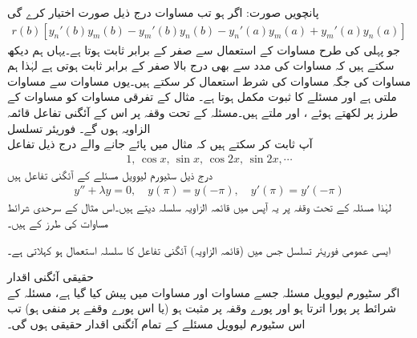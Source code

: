 پانچویں صورت: اگر  ہو تب مساوات   درج ذیل صورت اختیار کرے گی
\begin{align*}
r(b)[y_n'(b)y_m(b)-y_m'(b)y_n(b)-y_n'(a)y_m(a)+y_m'(a)y_n(a)]
\end{align*}
جو پہلی کی طرح  مساوات  کے استعمال سے صفر کے برابر ثابت ہوتا ہے۔یہاں ہم دیکھ سکتے ہیں کہ مساوات  کی مدد سے بھی درج بالا صفر کے برابر ثابت ہوتی ہے لہٰذا ہم مساوات  کی جگہ مساوات  کی شرط استعمال کر سکتے ہیں۔یوں مساوات  سے مساوات  ملتی ہے اور مسئلے کا ثبوت مکمل ہوتا ہے۔
مثال  کے تفرقی مساوات کو مساوات  کے طرز پر لکھتے ہوئے ،  اور  ملتے ہیں۔مسئلہ  کے تحت وقفہ  پر اس کے آئگنی تفاعل قائمہ الزاویہ ہوں گے۔
\quad فوریئر تسلسل\\
آپ ثابت کر سکتے ہیں کہ مثال  میں پائے جانے والے درج ذیل تفاعل 
\begin{align*}
1,\, \cos x , \, \sin x,\, \cos 2x,\, \sin 2x, \cdots
\end{align*}
درج ذیل سٹیورم لیوویل مسئلے کے آئگنی تفاعل ہیں
\begin{align*}
y''+\lambda y=0, \quad y(\pi)=y(-\pi), \quad y'(\pi)=y'(-\pi)
\end{align*}
 لہٰذا مسئلہ  کے تحت وقفہ  پر  یہ آپس میں قائمہ الزاویہ سلسلہ دیتے ہیں۔اس مثال کے سرحدی شرائط مساوات  کی طرز کے ہیں۔

ایسی عمومی فوریئر تسلسل جس میں (قائمہ الزاویہ) آئگنی تفاعل کا سلسلہ استعمال ہو  کہلاتی ہے۔ 

\quad حقیقی آئگنی اقدار\\
اگر سٹیورم لیوویل مسئلہ  جسے مساوات  اور مساوات  میں پیش کیا گیا ہے، مسئلہ  کے شرائط پر پورا اترتا ہو اور پورے وقفہ  پر  مثبت ہو (یا اس پورے وقفے پر   منفی ہو) تب اس سٹیورم لیوویل مسئلے کے تمام آئگنی اقدار حقیقی ہوں گی۔


